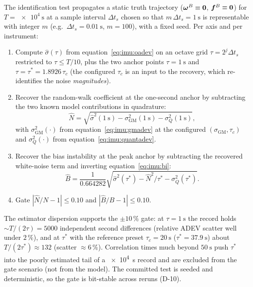 The identification test propagates a static truth trajectory
($\bm{\omega}^{B} \equiv \bm{0}$, $\bm{f}^{B} \equiv \bm{0}$) for $T =
\qty{e4}{\second}$ at a sample interval $\Delta t_s$ chosen so that
$m\,\Delta t_s = \qty{1}{\second}$ is representable with integer $m$
(e.g.\ $\Delta t_s = \qty{0.01}{\second}$, $m = 100$), with a fixed seed.
Per axis and per instrument:
\begin{enumerate}
  \item Compute $\hat{\sigma}(\tau)$ from
    equation~\eqref{eq:imu:oadev} on an octave grid $\tau = 2^j
    \Delta t_s$ restricted to $\tau \le T/10$, plus the two anchor
    points $\tau = \qty{1}{\second}$ and $\tau = \tau^{*} =
    1.8926\,\tau_c$ (the configured $\tau_c$ is an input to the
    recovery, which re-identifies the noise \emph{magnitudes}).
  \item Recover the random-walk coefficient at the one-second anchor by
    subtracting the two known model contributions in quadrature:
    \begin{equation}
      \hat{N} = \sqrt{ \hat{\sigma}^2(\qty{1}{\second})
        - \sigma_{\mathrm{GM}}^2(\qty{1}{\second})
        - \sigma_{Q}^2(\qty{1}{\second}) } ,
      \label{eq:imu:recovery}
    \end{equation}
    with $\sigma_{\mathrm{GM}}^2(\cdot)$ from
    equation~\eqref{eq:imu:gmadev} at the configured
    $(\sigma_{\mathrm{GM}}, \tau_c)$ and $\sigma_Q^2(\cdot)$ from
    equation~\eqref{eq:imu:quantadev}.
  \item Recover the bias instability at the peak anchor by subtracting
    the recovered white-noise term and inverting
    equation~\eqref{eq:imu:bi}:
    \begin{equation}
      \hat{B} = \frac{1}{0.664282}
        \sqrt{ \hat{\sigma}^2(\tau^{*}) - \hat{N}^2/\tau^{*}
          - \sigma_{Q}^2(\tau^{*}) } .
      \label{eq:imu:recoverybi}
    \end{equation}
  \item Gate $|\hat{N}/N - 1| \le 0.10$ and $|\hat{B}/B - 1| \le 0.10$.
\end{enumerate}
The estimator dispersion supports the $\pm 10\,\%$ gate: at $\tau =
\qty{1}{\second}$ the record holds $\sim T/(2\tau) = 5000$ independent
second differences (relative ADEV scatter well under $2\,\%$), and at
$\tau^{*}$ with the reference preset $\tau_c = \qty{20}{\second}$
($\tau^{*} = \qty{37.9}{\second}$) about $T/(2\tau^{*}) \approx 132$
(scatter $\approx 6\,\%$). Correlation times much beyond
$\qty{50}{\second}$ push $\tau^{*}$ into the poorly estimated tail of a
\qty{e4}{\second} record and are excluded from the gate scenario (not
from the model). The committed test is seeded and deterministic, so the
gate is bit-stable across reruns (D-10).

